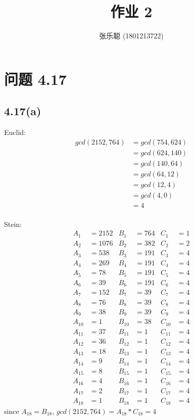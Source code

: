 \documentclass[acmlarge,screen]{acmart}
\begin{document}
\title{作业 2}
\author{张乐聪 (1801213722)}
\maketitle
\section{问题 4.17}
\subsection{4.17(a)}
\begin{multicols}{2}
Euclid:
\begin{align*}
	gcd(2152, 764) &= gcd(754, 624)\\
	&= gcd(624, 140)\\
	&= gcd(140, 64)\\
	&= gcd(64, 12)\\
	&= gcd(12, 4)\\
	&= gcd(4, 0)\\
	&= 4
\end{align*}
\columnbreak \\
Stein:
\begin{align*}
	A_1&=2152 & B_1&=764 & C_1&=1\\
	A_2&=1076 & B_2&=382 & C_2&=2\\
	A_3&=538 & B_3&=191 & C_3&=4\\
	A_4&=269 & B_4&=191 & C_4&=4\\
	A_5&=78 & B_5&=191 & C_5&=4\\
	A_6&=39 & B_6&=191 & C_6&=4\\
	A_7&=152 & B_7&=39 & C_7&=4\\
	A_8&=76 & B_8&=39 & C_8&=4\\
	A_9&=38 & B_9&=39 & C_9&=4\\
	A_{10}&=1 & B_{10}&=38 & C_{10}&=4\\
	A_{11}&=37 & B_{11}&=1 & C_{11}&=4\\
	A_{12}&=36 & B_{12}&=1 & C_{12}&=4\\
	A_{13}&=18 & B_{13}&=1 & C_{13}&=4\\
	A_{14}&=9 & B_{14}&=1 & C_{14}&=4\\
	A_{15}&=8 & B_{15}&=1 & C_{15}&=4\\
	A_{16}&=4 & B_{16}&=1 & C_{16}&=4\\
	A_{17}&=2 & B_{17}&=1 & C_{17}&=4\\
	A_{18}&=1 & B_{18}&=1 & C_{18}&=4
\end{align*}
since $A_{18}=B_{18}$, $gcd(2152, 764)=A_{18}*C_{18}=4$
\end{multicols}
\end{document}
